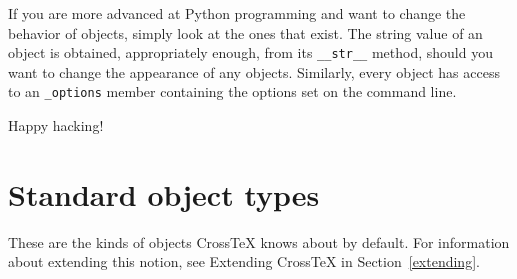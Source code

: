 \documentclass{article}
\newcommand{\XTeX}{Cross\TeX}
\begin{document}
If you are more advanced at Python programming and want to change the behavior of objects, simply look at the ones that exist. The string value of an object is obtained, appropriately enough, from its \texttt{\_\_str\_\_} method, should you want to change the appearance of any objects. Similarly, every object has access to an \texttt{\_options} member containing the options set on the command line.

Happy hacking!



\section{Standard object types}
\label{objects}

These are the kinds of objects \XTeX{} knows about by default. For information about extending this notion, see Extending \XTeX{} in Section~\ref{extending}.
\end{document}
